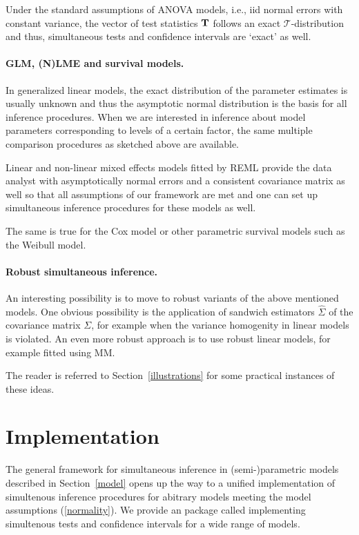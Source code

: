 \documentclass[12pt]{article}
\begin{document}
Under the standard assumptions of ANOVA models, i.e., iid normal errors with constant
variance, the vector of test statistics $\mathbf{T}$ follows an exact $\mathcal{T}$-distribution and
thus, simultaneous tests and confidence intervals are `exact' as well.

\paragraph{GLM, (N)LME and survival models.}

In generalized linear models, the exact distribution of the parameter estimates
is usually unknown and thus the asymptotic normal distribution is the basis for all
inference procedures. When we are interested in inference about model
parameters corresponding to levels of a certain factor, the same multiple 
comparison procedures as sketched above are available. 

Linear and non-linear mixed effects models fitted by REML provide
the data analyst with asymptotically normal errors and a consistent
covariance matrix as well so that all assumptions of our framework
are met and one can set up simultaneous inference procedures
for these models as well.

The same is true for the Cox model or other parametric survival models
such as the Weibull model.

\paragraph{Robust simultaneous inference.}

An interesting possibility is to move to robust variants of the above
mentioned models. One obvious possibility is the application
of sandwich estimators $\hat{\Sigma}$ of the covariance matrix $\Sigma$, 
for example when the variance homogenity in linear models is violated.
An even more robust approach is to use robust linear models, for example
fitted using MM.

The reader is referred to Section~\ref{illustrations} for some practical
instances of these ideas.

\section{Implementation} \label{implementation}

The general framework for simultaneous inference in 
(semi-)parametric models described in Section~\ref{model}
opens up the way to a unified implementation of simultenous inference
procedures for abitrary models meeting the model assumptions 
(\ref{normality}). We provide an \RR package called 
 \citep{pkg:multcomp} implementing
simultenous tests and confidence intervals for a wide range of models.
\end{document}
